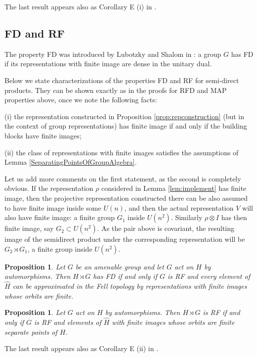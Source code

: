 \documentclass[11 pt, leqno, hidelinks]{amsart}%
\theoremstyle{plain}
\newtheorem{proposition}[theorem]{Proposition}
\numberwithin{equation}{section}
\begin{document}
The last result appears also as Corollary E (i) in \cite{BekkaPreprint}.
\medskip

\subsection{FD and RF}

The property FD was introduced by  Lubotzky and Shalom in \cite{LubotzkyShalom}: a group $G$ has FD if its representations with finite image are dense in the unitary dual.

Below we state characterizations of the properties FD and RF for semi-direct products. They can be shown exactly as in the proofs for RFD and MAP properties above, once we note the following facts:

(i)  the representation constructed in Proposition \ref{prop:repconstruction} (but in the context of group representations) has finite image if and only if the building blocks have finite images;

(ii) the class of representations with finite images satisfies the assumptions of Lemma \ref{SeparatingPointsOfGroupAlgebra}.
\smallskip

Let us add more comments on the first statement, as the second is completely obvious. If the representation $\rho$ considered in Lemma \ref{lem:implement} has finite image, then
the projective representation constructed there can be also assumed to have finite image inside some $U(n)$, and then the actual representation $V$ will also have finite image: a finite group $G_1$ inside $U(n^2)$. Similarly  $\rho \otimes I$ has then finite image, say $G_2 \subset U(n^2)$. As the pair above is covariant, the resulting image  of the semidirect product under the corresponding representation will be $G_2\rtimes G_1$, a finite group inside $U(n^2)$.

\begin{proposition}\label{FDversion} Let $G$ be an amenable group and let $G$ act on $H$ by automorphisms. Then $H\rtimes G$ has FD if and only if  $G$ is RF and every element of $\widehat H$ can be approximated in the Fell topology by representations with finite images  whose orbits are finite.
\end{proposition}

\begin{proposition}\label{RFversion}  Let $G$ act on $H$ by automorphisms.  Then $H\rtimes G$ is RF if and only if $G$ is RF and elements of $\widehat H$ with finite images  whose orbits are finite separate points of $H$.
\end{proposition}
The last result appears also as Corollary E (ii) in \cite{BekkaPreprint}.
\end{document}

